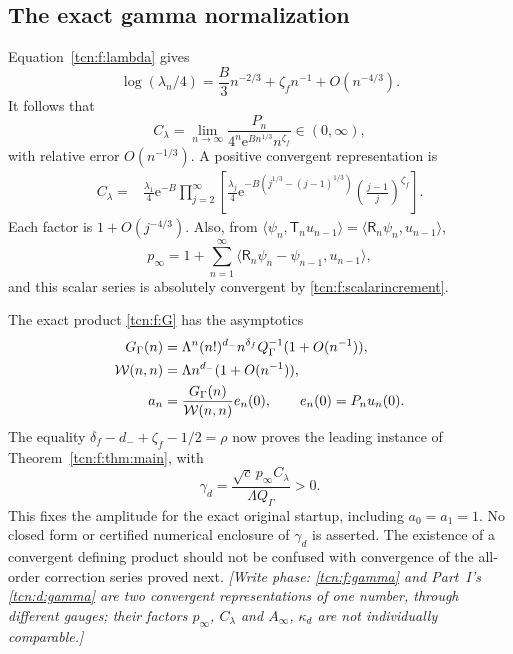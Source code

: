 \documentclass[11pt,letterpaper]{article}
\newcommand{\ip}[2]{\langle#1,#2\rangle}
\newcommand{\ee}{\mathrm e}
\theoremstyle{remark}
\begin{document}
\subsection{The exact gamma normalization}
Equation~\eqref{tcn:f:lambda} gives
\[
 \log(\lambda_n/4)=\frac B3n^{-2/3}+\zeta_fn^{-1}+O(n^{-4/3}).
\]
It follows that
\begin{equation}\label{tcn:f:Climit}
 C_\lambda=\lim_{n\to\infty}
 \frac{P_n}{4^n\ee^{Bn^{1/3}}n^{\zeta_f}}\in(0,\infty),
\end{equation}
with relative error $O(n^{-1/3})$. A positive convergent representation is
\begin{align}
 C_\lambda={}&\frac{\lambda_1}{4}\ee^{-B}
 \prod_{j=2}^{\infty}\left[
 \frac{\lambda_j}{4}
 \ee^{-B(j^{1/3}-(j-1)^{1/3})}
 \left(\frac{j-1}{j}\right)^{\zeta_f}\right].\label{tcn:f:Cproduct}
\end{align}
Each factor is $1+O(j^{-4/3})$. Also, from $\ip{\psi_n}{\mathsf T_nu_{n-1}}=\ip{\mathsf R_n\psi_n}{u_{n-1}}$,
\begin{equation}\label{tcn:f:pseries}
 p_\infty=1+\sum_{n=1}^{\infty}
 \ip{\mathsf R_n\psi_n-\psi_{n-1}}{u_{n-1}},
\end{equation}
and this scalar series is absolutely convergent by \eqref{tcn:f:scalarincrement}.

The exact product \eqref{tcn:f:G} has the asymptotics
\begin{align}
 G_\Gamma(n)&=\Lambda^n(n!)^{d_-} n^{\delta_f}Q_\Gamma^{-1}(1+O(n^{-1})),\notag\\
 \mathcal W(n,n)&=\Lambda n^{d_-}(1+O(n^{-1})),\label{tcn:f:gammaconversion}\\
 a_n&=\frac{G_\Gamma(n)}{\mathcal W(n,n)}e_n(0),\qquad e_n(0)=P_nu_n(0).\notag
\end{align}
The equality $\delta_f-d_-+\zeta_f-1/2=\rho$ now proves the leading instance of Theorem~\ref{tcn:f:thm:main}, with
\begin{equation}\label{tcn:f:gamma}
 \boxed{\displaystyle\gamma_d=
 \frac{\sqrt c\,p_\infty C_\lambda}{\Lambda Q_\Gamma}>0.}
\end{equation}
This fixes the amplitude for the exact original startup, including $a_0=a_1=1$. No closed form or certified numerical enclosure of $\gamma_d$ is asserted. The existence of a convergent defining product should not be confused with convergence of the all-order correction series proved next. \emph{[Write phase: \eqref{tcn:f:gamma} and Part~I's \eqref{tcn:d:gamma} are two convergent representations of one number, through different gauges; their factors $p_\infty$, $C_\lambda$ and $A_\infty$, $\kappa_d$ are not individually comparable.]}
\end{document}
